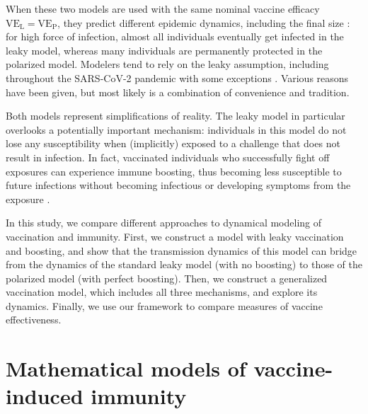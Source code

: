 \documentclass[12pt]{article}
\newcommand{\VE}{\ensuremath{\mathrm{VE}}}
\newcommand{\VEP}{\ensuremath{\VE_{\mathrm{P}}}}
\newcommand{\VEL}{\ensuremath{\VE_{\mathrm{L}}}}
\begin{document}
When these two models are used with the same nominal vaccine efficacy $\VEL = \VEP$, they predict different epidemic dynamics, including the final size \citep{smith1984assessment}:
for high force of infection, almost all individuals eventually get infected in the leaky model, whereas many individuals are permanently protected in the polarized model.
Modelers tend to rely on the leaky assumption, including throughout the SARS-CoV-2 pandemic \citep{dyson2021possible,gozzi2021importance,marziano2021vaccine,matrajt2021vaccine,park2022intermediate} with some exceptions \citep{bubar2021model,buckner2021dynamic}.
Various reasons have been given, but most likely is a combination of convenience and tradition.

Both models represent simplifications of reality.
The leaky model in particular overlooks a potentially important mechanism: individuals in this model do not lose any susceptibility when (implicitly) exposed to a challenge that does not result in infection. 
In fact, vaccinated individuals who successfully fight off exposures can experience immune boosting, thus becoming less susceptible to future infections without becoming infectious or developing symptoms from the exposure \citep{lavine2011natural,yang2020waning}.

In this study, we compare different approaches to dynamical modeling of vaccination and immunity.
First, we construct a model with leaky vaccination and boosting, and show that the transmission dynamics of this model can bridge from the dynamics of the standard leaky model (with no boosting) to those of the polarized model (with perfect boosting). 
Then, we construct a generalized vaccination model, which includes all three mechanisms, and explore its dynamics.
Finally, we use our framework to compare measures of vaccine effectiveness.

\section*{Mathematical models of vaccine-induced immunity}

\end{document}
